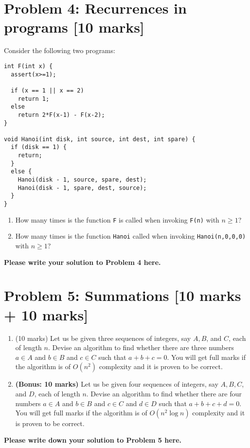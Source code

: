 \documentclass[11pt,twoside]{article}
\newcommand{\problem}[1]{\section*{Problem #1}}
\newenvironment{solution}{{\par\noindent\it Solution.}}{}
\begin{document}
\problem{4: Recurrences in programs [10 marks]}
Consider the following two programs:
\begin{lstlisting}
int F(int x) {
  assert(x>=1);
  
  if (x == 1 || x == 2) 
    return 1;
  else
    return 2*F(x-1) - F(x-2);
}

void Hanoi(int disk, int source, int dest, int spare) {
  if (disk == 1) {
    return;
  } 
  else {
    Hanoi(disk - 1, source, spare, dest);
    Hanoi(disk - 1, spare, dest, source);
  }
}
\end{lstlisting}
\begin{enumerate}
    \item How many times is the function \texttt{F} is called when invoking \texttt{F(n)} with $n\geq 1$? 
    \item How many times is the function \texttt{Hanoi} called when invoking \texttt{Hanoi(n,0,0,0)} with $n\geq 1$?
\end{enumerate}

\begin{solution}
\textbf{Please write your solution to Problem 4 here.}
\end{solution}

\problem{5: Summations [10 marks + 10 marks]}
\begin{enumerate}
    \item (10 marks) Let us be given three sequences of integers, say $A,B$, and $C$, each of length $n$. Devise an algorithm to find whether there are three numbers $a\in A$ and $b\in B$ and $c\in C$ such that $a+b+c=0$. You will get full marks if the algorithm is of $O(n^2)$ complexity and it is proven to be correct.
    
    \item \textbf{(Bonus: 10 marks)} Let us be given four sequences of integers, say $A,B,C$, and $D$, each of length $n$. Devise an algorithm to find whether there are four numbers $a\in A$ and $b\in B$ and $c\in C$ and $d\in D$ such that $a+b+c+d=0$. You will get full marks if the algorithm is of $O(n^2\log n)$ complexity and it is proven to be correct. 
\end{enumerate}
\begin{solution}
\textbf{Please write down your solution to Problem 5 here.}
\end{solution}
\end{document}
